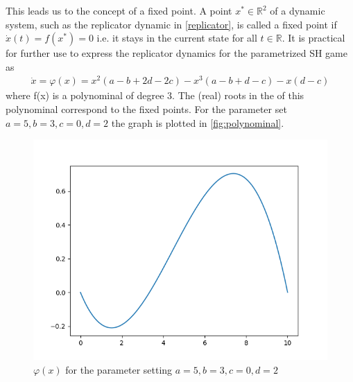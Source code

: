 \documentclass[12pt]{article}
\newcommand{\realnumb}{\mathbb{R}}
\begin{document}
This leads us to the concept of a fixed point. A point $x^* \in \realnumb^2$ of a dynamic system,
such as the replicator dynamic in \eqref{replicator}, is called a fixed point
if $\dot{x}(t) = f(x^*) = 0$ i.e. it stays in the current state for all $t \in 
\realnumb$. 
It is practical for further use to express the replicator dynamics for the
parametrized SH game as 
\begin{align}
        \dot{x} = \varphi(x) = x^2(a-b+2d-2c) - x^3(a-b+d-c) -x(d-c) 
\end{align}
where f(x) is a polynominal of degree $3$. The (real) roots in the 
of this polynominal correspond to the fixed points. 
For the parameter set $a=5, b=3, c=0, d=2$  the graph is plotted in \ref{fig:polynominal}.
\begin{figure}[h]
        \centering
        \includegraphics[scale=0.5]{polynominal.png}
        \caption{$\varphi(x)$ for the parameter setting $a=5, b=3, c=0, d=2$}
\end{figure}
\end{document}
